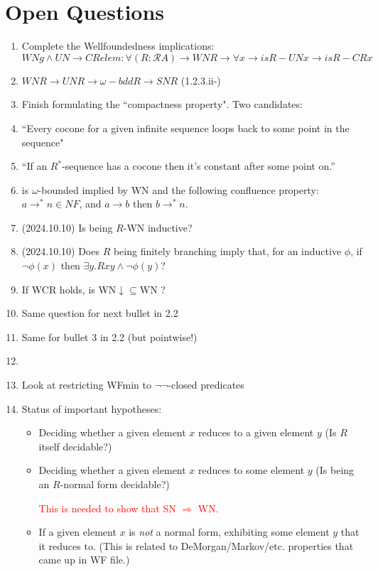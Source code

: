 \documentclass{scrartcl}
\begin{document}
  \section{Open Questions }
  \begin{enumerate}
    \item Complete the Wellfoundedness implications:
       \[ WNg \land UN \to CRelem :
       \forall (R : \mathscr{R} A) \to WN R \to \forall x \to is R -UN x \to is R -CR x \]
       \item $WN R \to UN R \to \omega-bdd R \to SN R$ (1.2.3.ii-)
        \item Finish formulating the ``compactness property".  Two candidates:
         \item ``Every cocone for a given infinite sequence loops back to some point in the sequence"
         \item ``If an $R^*$-sequence has a cocone then it's constant after some point on.''
         \item is $\omega$-bounded implied by WN and the following confluence property:
         $a \to^* n \in NF$, and $a \to b$ then $b \to^* n $.
    \item (2024.10.10) Is being $R$-WN inductive?
    \item (2024.10.10) Does $R$ being finitely branching imply
     that, for an inductive $\phi$, if $\lnot \phi(x)$ then
     $\exists y. Rxy \land \lnot \phi(y)$?

    \item If WCR holds, is WN$\downarrow\subseteq$WN ?
    \item Same question for next bullet in 2.2
    \item Same for bullet 3 in 2.2 (but pointwise!)
    \item \item Look at restricting WFmin to $\lnot\lnot$-closed predicates
    \item Status of important hypotheses:
      \begin{itemize}
        \item Deciding whether a given element $x$ reduces to a given element $y$
        (Is $R$ itself decidable?)
        \item Deciding whether a given element $x$ reduces to some element $y$
        (Is being an $R$-normal form decidable?)

        {\textcolor{red}{This is needed to show that SN $\Rightarrow$ WN.}}

        \item If a given element $x$ is \emph{not} a normal form,
        exhibiting some element $y$ that it reduces to.
        (This is related to DeMorgan/Markov/etc. properties that came up in WF file.)


\end{itemize}
\end{enumerate}
\end{document}
